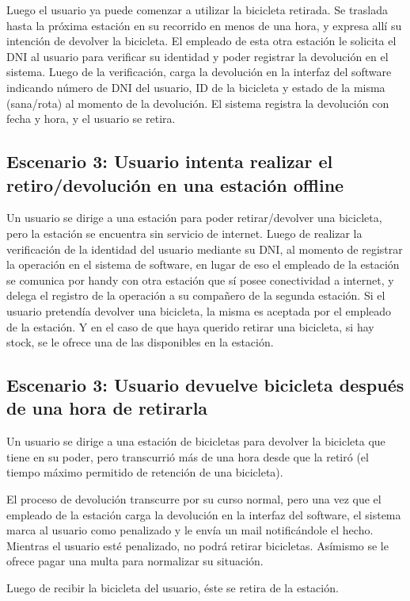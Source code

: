 \documentclass[a4paper, 10pt, twoside]{article}
\begin{document}
Luego el usuario ya puede comenzar a utilizar la bicicleta retirada. Se traslada hasta la próxima estación en su recorrido en menos de una hora, y expresa allí su intención de devolver la bicicleta. El empleado de esta otra estación le solicita el DNI al usuario para verificar su identidad y poder registrar la devolución en el sistema. Luego de la verificación, carga la devolución en la interfaz del software indicando número de DNI del usuario, ID de la bicicleta y estado de la misma (sana/rota) al momento de la devolución. El sistema registra la devolución con fecha y hora, y el usuario se retira.


\subsection{Escenario 3: Usuario intenta realizar el retiro/devolución en una estación offline}

Un usuario se dirige a una estación para poder retirar/devolver una bicicleta, pero la estación se encuentra sin servicio de internet. Luego de realizar la verificación de la identidad del usuario mediante su DNI, al momento de registrar la operación en el sistema de software, en lugar de eso el empleado de la estación se comunica por handy con otra estación que sí posee conectividad a internet, y delega el registro de la operación a su compañero de la segunda estación. Si el usuario pretendía devolver una bicicleta, la misma es aceptada por el empleado de la estación. Y en el caso de que haya querido retirar una bicicleta, si hay stock, se le ofrece una de las disponibles en la estación.


\subsection{Escenario 3: Usuario devuelve bicicleta después de una hora de retirarla}

Un usuario se dirige a una estación de bicicletas para devolver la bicicleta que tiene en su poder, pero transcurrió más de una hora desde que la retiró (el tiempo máximo permitido de retención de una bicicleta).

El proceso de devolución transcurre por su curso normal, pero una vez que el empleado de la estación carga la devolución en la interfaz del software, el sistema marca al usuario como penalizado y le envía un mail notificándole el hecho. Mientras el usuario esté penalizado, no podrá retirar bicicletas. Asímismo se le ofrece pagar una multa para normalizar su situación.

Luego de recibir la bicicleta del usuario, éste se retira de la estación.
\end{document}
